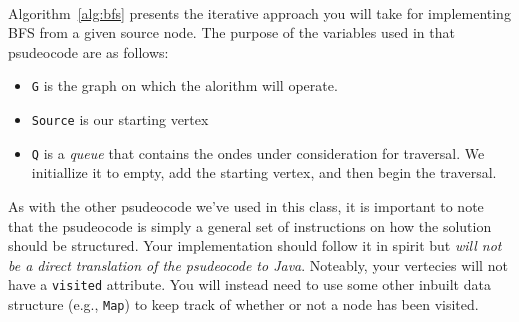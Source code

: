 \vspace{0.25cm}\\

\noindent Algorithm~\ref{alg:bfs} presents the iterative approach you will take
for implementing BFS from a given source node. The purpose of the variables 
used in that psudeocode are as follows:
\begin{itemize}
    \item \lstinline|G| is the graph on which the alorithm will operate.
    \item \lstinline|Source| is our starting vertex
    \item \lstinline|Q| is a \textit{queue} that contains the ondes under consideration for traversal. We initiallize it to empty, add the starting vertex, and then begin the traversal.
\end{itemize}

As with the other psudeocode we've used in this class, it is important to note
that the psudeocode is simply a general set of instructions on how the solution
should be structured. Your implementation should follow it in spirit but
\textit{will not be a direct translation of the psudeocode to Java}. Noteably,
your vertecies will not have a \lstinline|visited| attribute. You will instead
need to use some other inbuilt data structure (e.g., \lstinline|Map|) to keep
track of whether or not a node has been visited.


